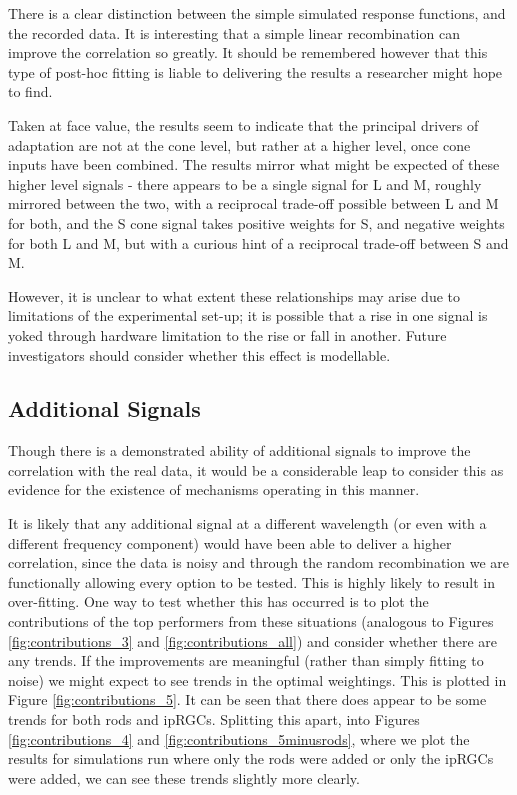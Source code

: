 There is a clear distinction between the simple simulated response functions, and the recorded data. It is interesting that a simple linear recombination can improve the correlation so greatly. It should be remembered however that this type of post-hoc fitting is liable to delivering the results a researcher might hope to find. 

Taken at face value, the results seem to indicate that the principal drivers of adaptation are not at the cone level, but rather at a higher level, once cone inputs have been combined. The results mirror what might be expected of these higher level signals - there appears to be a single signal for L and M, roughly mirrored between the two, with a reciprocal trade-off possible between L and M for both, and the S cone signal takes positive weights for S, and negative weights for both L and M, but with a curious hint of a reciprocal trade-off between S and M.

However, it is unclear to what extent these relationships may arise due to limitations of the experimental set-up; it is possible that a rise in one signal is yoked through hardware limitation to the rise or fall in another. Future investigators should consider whether this effect is modellable.

\subsection{Additional Signals}

Though there is a demonstrated ability of additional signals to improve the correlation with the real data, it would be a considerable leap to consider this as evidence for the existence of mechanisms operating in this manner.

It is likely that any additional signal at a different wavelength (or even with a different frequency component) would have been able to deliver a higher correlation, since the data is noisy and through the random recombination we are functionally allowing every option to be tested. This is highly likely to result in over-fitting. One way to test whether this has occurred is to plot the contributions of the top performers from these situations (analogous to Figures \ref{fig:contributions_3} and \ref{fig:contributions_all}) and consider whether there are any trends. If the improvements are meaningful (rather than simply fitting to noise) we might expect to see trends in the optimal weightings. This is plotted in Figure \ref{fig:contributions_5}. It can be seen that there does appear to be some trends for both rods and \glspl{ipRGC}. Splitting this apart, into Figures \ref{fig:contributions_4} and \ref{fig:contributions_5minusrods}, where we plot the results for simulations run where only the rods were added or only the \glspl{ipRGC} were added, we can see these trends slightly more clearly.

